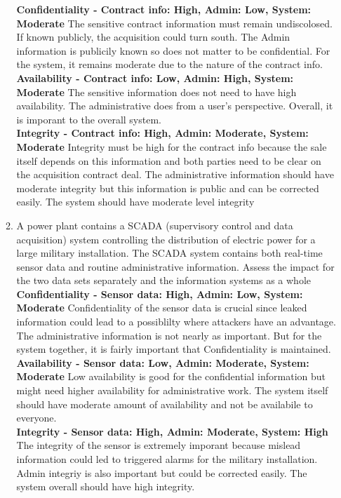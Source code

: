 \documentclass[12pt]{article}
\begin{document}
\begin{enumerate}
\begin{enumerate}
		\textbf{Confidentiality - Contract info: High, Admin: Low, System: Moderate } The sensitive contract information must remain undiscolosed. If known publicly, the acquisition could turn south. The Admin information is publicily known so does not matter to be confidential. For the system, it remains moderate due to the nature of the contract info. \\
		\textbf{Availability - Contract info: Low, Admin: High, System: Moderate } The sensitive information does not need to have high availability. The administrative does from a user's perspective. Overall, it is imporant to the overall system.\\
		\textbf{Integrity - Contract info: High, Admin: Moderate, System: Moderate } Integrity must be high for the contract info because the sale itself depends on this information and both parties need to be clear on the acquisition contract deal. The administrative information should have moderate integrity but this information is public and can be corrected easily. The system should have moderate level integrity \\

		\item{A power plant contains a SCADA (supervisory control and data acquisition) system controlling the distribution of electric power for a large military installation. The SCADA system contains both real-time sensor data and routine administrative information. Assess the impact for the two data sets separately and the information systems as a whole} \\

		\textbf{Confidentiality - Sensor data: High, Admin: Low, System: Moderate} Confidentiality of the sensor data is crucial since leaked information could lead to a possiblilty where attackers have an advantage. The administrative information is not nearly as important. But for the system together, it is fairly important that Confidentiality is maintained. \\
		\textbf{Availability - Sensor data: Low, Admin: Moderate, System: Moderate } Low availability is good for the confidential information but might need higher availability for administrative work. The system itself should have moderate amount of availability and not be availabile to everyone. \\
		\textbf{Integrity - Sensor data: High, Admin: Moderate, System: High} The integrity of the sensor is extremely imporant because mislead information could led to triggered alarms for the military installation. Admin integriy is also important but could be corrected easily. The system overall should have high integrity. \\


\end{enumerate}
\end{enumerate}
\end{document}
